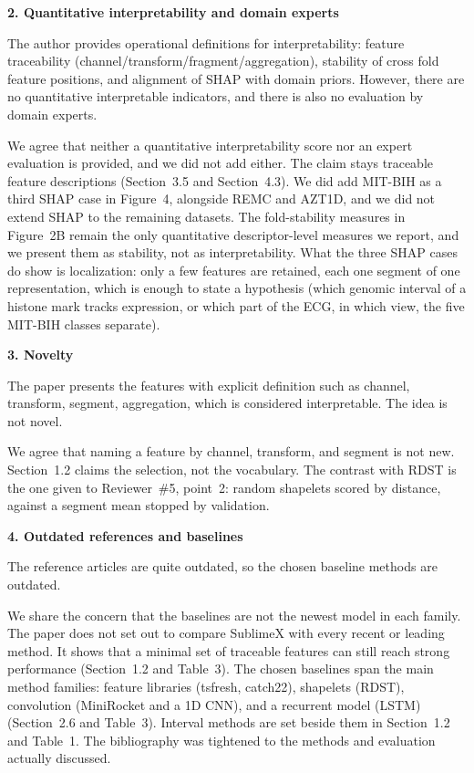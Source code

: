 \documentclass[11pt]{article}
\makeatletter
\newcommand{\rsp}{\par\vspace{0.9em}}
\newcommand{\rcitem}[2]{\begin{reviewerbox}\textbf{#1}\par\smallskip#2\end{reviewerbox}}
\newcommand{\response}[2]{%
  \begin{responsebox}#1%
  \def\@responseitems{#2}%
  \ifx\@responseitems\empty\else\begin{itemize}[nosep,leftmargin=1.2em]#2\end{itemize}\fi
  \end{responsebox}\rsp}
\makeatother
\begin{document}
\rcitem{2. Quantitative interpretability and domain experts}{The author provides operational
definitions for interpretability: feature traceability (channel/transform/fragment/aggregation),
stability of cross fold feature positions, and alignment of SHAP with domain priors. However, there
are no quantitative interpretable indicators, and there is also no evaluation by domain experts.}

\response{We agree that neither a quantitative interpretability score nor an expert evaluation is
provided, and we did not add either. The claim stays traceable feature descriptions (Section~3.5
and Section~4.3). We did add MIT-BIH as a third SHAP case in Figure~4, alongside REMC and AZT1D,
and we did not extend SHAP to the remaining datasets. The fold-stability measures in Figure~2B
remain the only quantitative descriptor-level measures we report, and we present them as stability,
not as interpretability. What the three SHAP cases do show is localization: only a few features
are retained, each one segment of one representation, which is enough to state a hypothesis (which
genomic interval of a histone mark tracks expression, or which part of the ECG, in which view,
the five MIT-BIH classes separate).}{}

\rcitem{3. Novelty}{The paper presents the features with explicit definition such as channel,
transform, segment, aggregation, which is considered interpretable. The idea is not novel.}

\response{We agree that naming a feature by channel, transform, and segment is not new.
Section~1.2 claims the selection, not the vocabulary. The contrast with RDST is the one given
to Reviewer~\#5, point~2: random shapelets scored by distance, against a segment mean stopped
by validation.}{}

\rcitem{4. Outdated references and baselines}{The reference articles are quite outdated, so the chosen
baseline methods are outdated.}

\response{We share the concern that the baselines are not the newest model in each family. The
paper does not set out to compare SublimeX with every recent or leading method. It shows that a
minimal set of traceable features can still reach strong performance (Section~1.2 and Table~3).
The chosen baselines span the main method families: feature libraries (tsfresh, catch22),
shapelets (RDST), convolution (MiniRocket and a 1D CNN), and a recurrent model (LSTM)
(Section~2.6 and Table~3). Interval methods are set beside them in Section~1.2 and Table~1.
The bibliography was tightened to the methods and evaluation actually discussed.}{}
\end{document}
